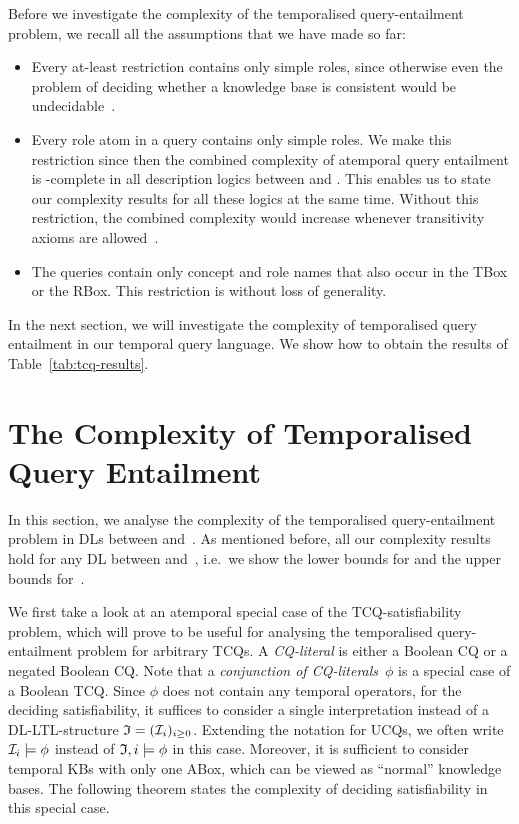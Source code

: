Before we investigate the complexity of the temporalised query-entailment
problem, we recall all the assumptions that we have made so far:
\begin{itemize}
    \item Every at-least restriction contains only simple roles, since otherwise
        even the problem of deciding whether a knowledge base is consistent
        would be undecidable~\cite{HoST-IGPL00}.
    \item Every role atom in a query contains only simple roles.  We make this
        restriction since then the combined complexity of atemporal query
        entailment is \ExpTime-complete in all description logics between \ALC
        and \SHQ.
        This enables us to state our complexity results for all these logics at
        the same time.
        Without this restriction, the combined complexity would increase
        whenever transitivity axioms are allowed~\cite{ELO+-IJCAI09}.
    \item The queries contain only concept and role names that also occur
        in the TBox or the RBox.  This restriction is without loss of
        generality.
\end{itemize}

In the next section, we will investigate the complexity of temporalised query
entailment in our temporal query language.  We show how to obtain the results of
Table~\ref{tab:tcq-results}.


\section{The Complexity of Temporalised Query Entailment}\label{sec:complexity-query-entailment}

In this section, we analyse the complexity of the temporalised query-entailment
problem in DLs between \ALC and~\SHQ.
%
As mentioned before, all our complexity results hold for any DL between \ALC
and~\SHQ, i.e.~we show the lower bounds for \ALC and the upper bounds for~\SHQ.

We first take a look at an atemporal special case of the TCQ-satisfiability
problem, which will prove to be useful for analysing the temporalised
query-entailment problem for arbitrary TCQs.  A \emph{CQ-literal} is either a
Boolean CQ or a negated Boolean CQ\@.  Note that a \emph{conjunction of
CQ-literals}~$\phi$ is a special case of a Boolean TCQ\@.  Since $\phi$ does not
contain any temporal operators, for the deciding satisfiability, it suffices to
consider a single interpretation instead of a DL-LTL-structure
$\mathfrak{I}=(\mathcal{I}_i)_{i\ge 0}$.  Extending the notation for UCQs, we often write
$\mathcal{I}_i\models\phi$ instead of $\mathfrak{I},i\models\phi$ in this case.  Moreover, it
is sufficient to consider temporal KBs with only one ABox, which can be viewed
as \enquote{normal} knowledge bases.
%
The following theorem states the complexity of deciding satisfiability in this
special case.

